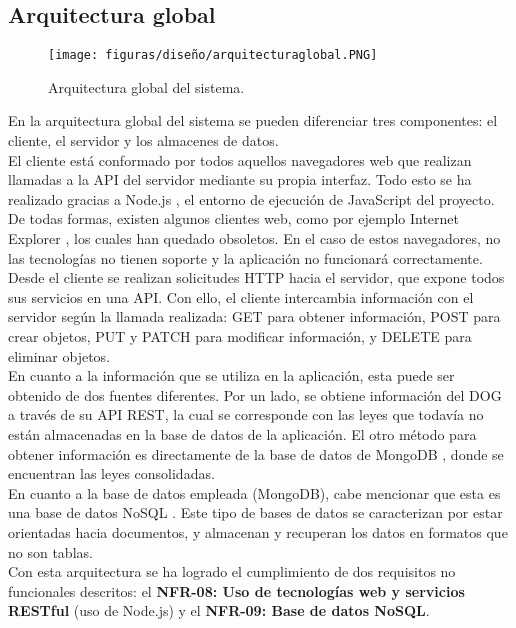 \subsection{Arquitectura global}

\begin{figure}[H]
\centerline{\texttt{[image: figuras/diseño/arquitecturaglobal.PNG]}}
\caption{Arquitectura global del sistema.}
\label{enlaceArquitecturaGlobal}
\end{figure}

En la arquitectura global del sistema se pueden diferenciar tres componentes: el cliente, el servidor y los almacenes de datos.
\\

El cliente está conformado por todos aquellos navegadores web que realizan llamadas a la API del servidor mediante su propia interfaz. Todo esto se ha realizado gracias a Node.js \cite{nodejs}, el entorno de ejecución de JavaScript del proyecto.
\\

De todas formas, existen algunos clientes web, como por ejemplo Internet Explorer \cite{explorer}, los cuales han quedado obsoletos. En el caso de estos navegadores, no las tecnologías no tienen soporte y la aplicación no funcionará correctamente.
\\

Desde el cliente se realizan solicitudes HTTP hacia el servidor, que expone todos sus servicios en una API. Con ello, el cliente intercambia información con el servidor según la llamada realizada: GET para obtener información, POST para crear objetos, PUT y PATCH para modificar información, y DELETE para eliminar objetos.
\\

En cuanto a la información que se utiliza en la aplicación, esta puede ser obtenido de dos fuentes diferentes. Por un lado, se obtiene información del DOG a través de su API REST, la cual se corresponde con las leyes que todavía no están almacenadas en la base de datos de la aplicación. El otro método para obtener información es directamente de la base de datos de MongoDB \cite{mongodb}, donde se encuentran las leyes consolidadas.
\\

En cuanto a la base de datos empleada (MongoDB), cabe mencionar que esta es una base de datos NoSQL \cite{nosql}. Este tipo de bases de datos se caracterizan por estar orientadas hacia documentos, y almacenan y recuperan los datos en formatos que no son tablas.
\\

Con esta arquitectura se ha logrado el cumplimiento de dos requisitos no funcionales descritos: el {\bf NFR-08: Uso de tecnologías web y servicios RESTful} (uso de Node.js) y el {\bf NFR-09: Base de datos NoSQL}.